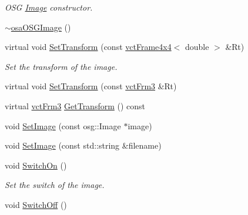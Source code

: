 \begin{DoxyCompactItemize}
\begin{DoxyCompactList}\small\item\em O\+S\+G \hyperlink{classosa_o_s_g_image_1_1_image}{Image} constructor. \end{DoxyCompactList}\item 
\hyperlink{classosa_o_s_g_image_a8173c8efc6b71132dbeb06337d58adee}{$\sim$osa\+O\+S\+G\+Image} ()
\item 
virtual void \hyperlink{classosa_o_s_g_image_aa00d15d38c9815115e1b7a9f76ea1519}{Set\+Transform} (const \hyperlink{classvct_frame4x4}{vct\+Frame4x4}$<$ double $>$ \&Rt)
\begin{DoxyCompactList}\small\item\em Set the transform of the image. \end{DoxyCompactList}\item 
virtual void \hyperlink{classosa_o_s_g_image_a726fd6ef80d91c03a7e694368df99b0a}{Set\+Transform} (const \hyperlink{vct_transformation_types_8h_a81feda0a02c2d1bc26e5553f409fed20}{vct\+Frm3} \&Rt)
\item 
virtual \hyperlink{vct_transformation_types_8h_a81feda0a02c2d1bc26e5553f409fed20}{vct\+Frm3} \hyperlink{classosa_o_s_g_image_a42485228a801d1800bdc569353698538}{Get\+Transform} () const 
\item 
void \hyperlink{classosa_o_s_g_image_af7c008cd20caffe9916f7d816fed9f30}{Set\+Image} (const osg\+::\+Image $\ast$image)
\item 
void \hyperlink{classosa_o_s_g_image_ad6144b20ccc04f42499bcbd6c7471b67}{Set\+Image} (const std\+::string \&filename)
\item 
void \hyperlink{classosa_o_s_g_image_a8e3a355e23637076ff03eb1ba8fe17e4}{Switch\+On} ()
\begin{DoxyCompactList}\small\item\em Set the switch of the image. \end{DoxyCompactList}\item 
void \hyperlink{classosa_o_s_g_image_a52fcffce17b588c0dc4e8cbc50d6194d}{Switch\+Off} ()
\end{DoxyCompactItemize}
